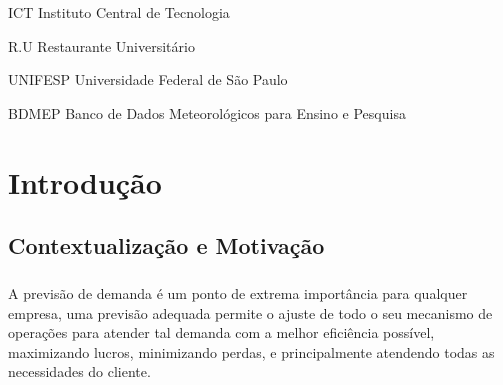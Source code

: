 \documentclass[	12pt, Times, openright, twoside, a4paper, english, brazil]{abntex2}
\begin{document}
    \listoffigures*
    \cleardoublepage

    \listoftables*
    \cleardoublepage

    \begin{siglas}
    \item[ICT] Instituto Central de Tecnologia
    \item[R.U] Restaurante Universitário
    \item[UNIFESP] Universidade Federal de São Paulo
    \item[BDMEP] Banco de Dados Meteorológicos para Ensino e Pesquisa

    \end{siglas}


    \tableofcontents*
    \cleardoublepage

  \textual

  \chapter{Introdução}
      \section{Contextualização e Motivação}

        \paragraph*{} A previsão de demanda é um ponto de extrema importância para qualquer empresa, uma previsão adequada permite o ajuste de todo o seu mecanismo de operações para atender tal demanda com a melhor eficiência possível, maximizando lucros, minimizando perdas, e principalmente atendendo todas as necessidades do cliente.
\end{document}
